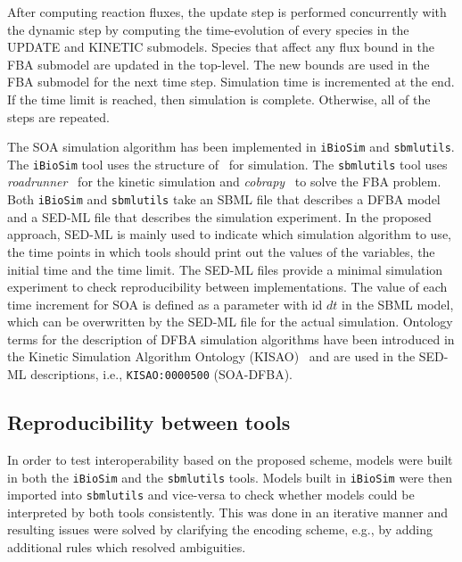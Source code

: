 \documentclass{bioinfo}
\begin{document}
\begin{methods}
After computing reaction fluxes, the update step is performed concurrently with the dynamic step by computing the time-evolution of every species in the UPDATE and KINETIC submodels. Species that affect any flux bound in the FBA submodel are updated in the top-level. The new bounds are used in the FBA submodel for the next time step. Simulation time is incremented at the end. If the time limit is reached, then simulation is complete. Otherwise, all of the steps are repeated. 

The SOA simulation algorithm has been implemented in \texttt{iBioSim} and \texttt{sbmlutils}. The \texttt{iBioSim} tool uses the structure of~\citep{watanabe2014} for simulation. The \texttt{sbmlutils} tool uses \emph{roadrunner}~\citep{roadrunner} for the kinetic simulation and \emph{cobrapy}~\citep{COBRAPY} to solve the FBA problem. Both \texttt{iBioSim} and \texttt{sbmlutils} take an SBML file that describes a DFBA model and a SED-ML file that describes the simulation experiment. In the proposed approach, SED-ML is mainly used to indicate which simulation algorithm to use, the time points in which tools should print out the values of the variables, the initial time and the time limit. The SED-ML files provide a minimal simulation experiment to check reproducibility between implementations. The value of each time increment for SOA is defined as a parameter with id $dt$ in the SBML model, which can be overwritten by the SED-ML file for the actual simulation.
Ontology terms for the description of DFBA simulation algorithms have been introduced in the Kinetic Simulation Algorithm Ontology (KISAO)~\citep{kisao} and are used in the SED-ML descriptions, i.e., \texttt{KISAO:0000500} (SOA-DFBA).



\subsection{Reproducibility between tools}
\label{met:reproducibility}
In order to test interoperability based on the proposed scheme, models were built in both the \texttt{iBioSim} and the \texttt{sbmlutils} tools. Models built in \texttt{iBioSim} were then imported into \texttt{sbmlutils} and vice-versa to check whether models could be interpreted by both tools consistently. This was done in an iterative manner and resulting issues were solved by clarifying the encoding scheme, e.g., by adding additional rules which resolved ambiguities.


\end{methods}
\end{document}
